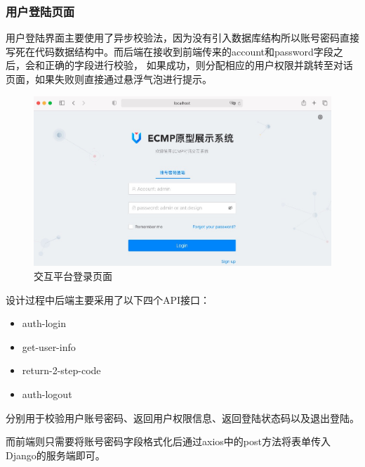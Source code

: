 \documentclass[supercite]{HustGraduPaper}
\theoremstyle{definition}
\begin{document}
\subsubsection{用户登陆页面}
用户登陆界面主要使用了异步校验法，因为没有引入数据库结构所以账号密码直接写死在代码数据结构中。而后端在接收到前端传来的account和password字段之后，会和正确的字段进行校验，
如果成功，则分配相应的用户权限并跳转至对话页面，如果失败则直接通过悬浮气泡进行提示。
\begin{figure}[H] %
  \centering %
  \includegraphics[width=1\textwidth]{images/login.jpg} %
  \caption{交互平台登录页面} %
  \label{Fig.login} %
\end{figure}
设计过程中后端主要采用了以下四个API接口：
\begin{itemize}
  \item auth-login
  \item get-user-info
  \item return-2-step-code
  \item auth-logout
\end{itemize}

分别用于校验用户账号密码、返回用户权限信息、返回登陆状态码以及退出登陆。

而前端则只需要将账号密码字段格式化后通过axios中的post方法将表单传入Django的服务端即可。
\end{document}
